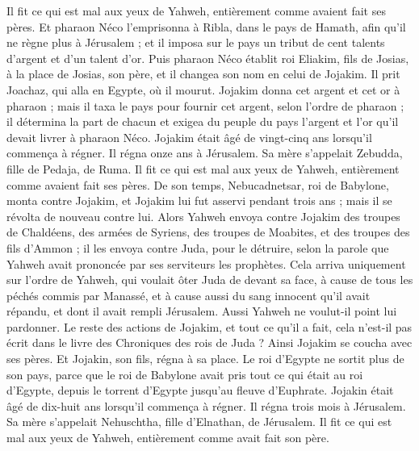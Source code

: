 \begin{multicols}{2}
Il fit ce qui est mal aux yeux de Yahweh, entièrement comme avaient fait ses pères.
Et pharaon Néco l’emprisonna à Ribla, dans le pays de Hamath, afin qu’il ne règne plus à Jérusalem ; et il imposa sur le pays un tribut de cent talents d’argent et d’un talent d’or.
Puis pharaon Néco établit roi Eliakim, fils de Josias, à la place de Josias, son père, et il changea son nom en celui de Jojakim. Il prit Joachaz, qui alla en Egypte, où il mourut.
Jojakim donna cet argent et cet or à pharaon ; mais il taxa le pays pour fournir cet argent, selon l’ordre de pharaon ; il détermina la part de chacun et exigea du peuple du pays l’argent et l’or qu’il devait livrer à pharaon Néco.
Jojakim était âgé de vingt-cinq ans lorsqu’il commença à régner. Il régna onze ans à Jérusalem. Sa mère s’appelait Zebudda, fille de Pedaja, de Ruma.
Il fit ce qui est mal aux yeux de Yahweh, entièrement comme avaient fait ses pères.
\VerseOne{}De son temps, Nebucadnetsar, roi de Babylone, monta contre Jojakim, et Jojakim lui fut asservi pendant trois ans ; mais il se révolta de nouveau contre lui.
Alors Yahweh envoya contre Jojakim des troupes de Chaldéens, des armées de Syriens, des troupes de Moabites, et des troupes des fils d’Ammon ; il les envoya contre Juda, pour le détruire, selon la parole que Yahweh avait prononcée par ses serviteurs les prophètes.
Cela arriva uniquement sur l’ordre de Yahweh, qui voulait ôter Juda de devant sa face, à cause de tous les péchés commis par Manassé,
et à cause aussi du sang innocent qu’il avait répandu, et dont il avait rempli Jérusalem. Aussi Yahweh ne voulut-il point lui pardonner.
Le reste des actions de Jojakim, et tout ce qu’il a fait, cela n’est-il pas écrit dans le livre des Chroniques des rois de Juda ?
Ainsi Jojakim se coucha avec ses pères. Et Jojakin, son fils, régna à sa place.
Le roi d’Egypte ne sortit plus de son pays, parce que le roi de Babylone avait pris tout ce qui était au roi d’Egypte, depuis le torrent d’Egypte jusqu’au fleuve d’Euphrate.
Jojakin était âgé de dix-huit ans lorsqu’il commença à régner. Il régna trois mois à Jérusalem. Sa mère s’appelait Nehuschtha, fille d’Elnathan, de Jérusalem.
Il fit ce qui est mal aux yeux de Yahweh, entièrement comme avait fait son père.

\end{multicols}
